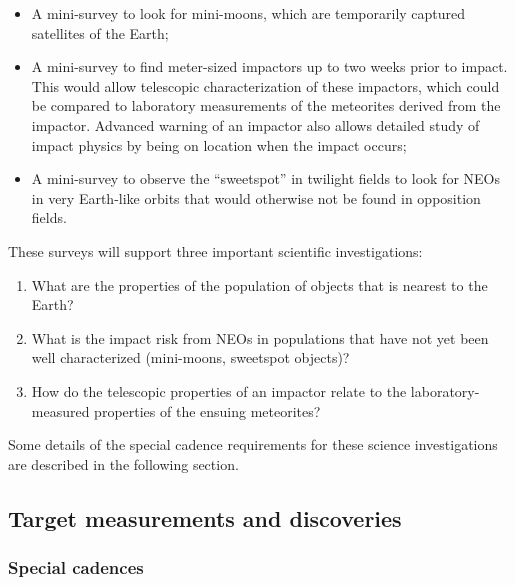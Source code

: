 \begin{itemize}
\item A mini-survey to look for mini-moons, which are temporarily captured
satellites of the Earth;
\item A mini-survey to find meter-sized impactors up to two weeks prior to impact.
This would allow telescopic characterization of these impactors, which could
be compared to laboratory measurements of the meteorites derived from
the impactor. Advanced warning of an impactor also allows detailed
study of impact physics by being on location when the impact
occurs;
\item A mini-survey to observe the ``sweetspot'' in twilight fields
to look for NEOs in very Earth-like orbits that would otherwise not
be found in opposition fields.
\end{itemize}

These surveys will support three important scientific investigations:
\begin{enumerate}
\item What are the properties of the population of objects that is
nearest to the Earth?
\item What is the impact risk from NEOs in populations that
have not yet been well characterized (mini-moons, sweetspot objects)?
\item How do the telescopic properties of an impactor relate to the
laboratory-measured properties of the ensuing meteorites?
\end{enumerate}

Some details of the special cadence requirements for these 
science investigations are described in the following section.


\subsection{Target measurements and discoveries}
\label{sec:\secname:targets}

\subsubsection{Special cadences}

